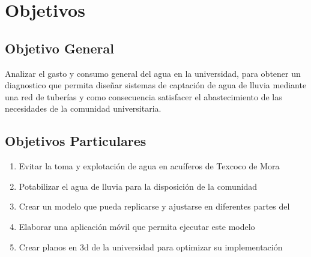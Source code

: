 \chapter{Objetivos}

\section{Objetivo General}
Analizar el gasto y consumo general  del agua en la universidad, para obtener un diagnostico que permita  diseñar sistemas de captación de agua de lluvia mediante una red de tuberías y como consecuencia satisfacer el abastecimiento de las necesidades de la comunidad universitaria.
\section{Objetivos Particulares}

\begin{enumerate}
    \item Evitar la toma y explotación de agua en acuíferos de Texcoco de Mora
    \item Potabilizar el agua de lluvia para la disposición de la comunidad
    \item Crear un modelo que pueda replicarse y ajustarse en diferentes partes del  %
    \item Elaborar una aplicación móvil que permita ejecutar este modelo %
    \item Crear planos en 3d de la universidad para optimizar su implementación
\end{enumerate}




